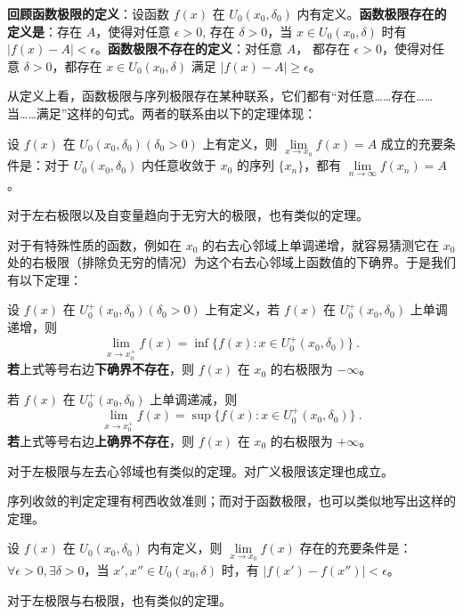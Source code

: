 \textbf{回顾函数极限的定义}：设函数 $f(x)$ 在 $U_0(x_0,\delta_0)$ 内有定义。\textbf{函数极限存在的定义是}：存在 $A$，使得对任意 $\epsilon >0$, 存在 $\delta>0$，当 $x\in U_0(x_0,\delta)$ 时有 $|f(x)-A|<\epsilon$。\textbf{函数极限不存在的定义}：对任意 $A$， 都存在 $\epsilon>0$，使得对任意 $\delta>0$，都存在 $x\in U_0(x_0,\delta)$ 满足 $|f(x)-A|\ge \epsilon$。

从定义上看，函数极限与序列极限存在某种联系，它们都有“对任意……存在……当……满足”这样的句式。两者的联系由以下的定理体现：

\begin{theorem}{}
设 $f(x)$ 在 $U_0(x_0,\delta_0)(\delta_0>0)$ 上有定义，则 $\lim\limits_{x\rightarrow x_0}f(x)=A$ 成立的充要条件是：对于 $U_0(x_0,\delta_0)$ 内任意收敛于 $x_0$ 的序列 $\{x_n\}$，都有 $\lim\limits_{n\rightarrow \infty}f(x_n)=A$。

对于左右极限以及自变量趋向于无穷大的极限，也有类似的定理。
\end{theorem}

对于有特殊性质的函数，例如在 $x_0$ 的右去心邻域上单调递增，就容易猜测它在 $x_0$ 处的右极限（排除负无穷的情况）为这个右去心邻域上函数值的下确界。于是我们有以下定理：
\begin{theorem}{}
设 $f(x)$ 在 $U_0^+(x_0,\delta_0)(\delta_0>0)$ 上有定义，若 $f(x)$ 在  $U_0^+(x_0,\delta_0)$ 上单调递增，则
\begin{equation}
  \lim\limits_{x\rightarrow x_0^+}f(x)=\inf\{f(x):x\in U_0^+(x_0,\delta_0)\}~.
\end{equation}
\textbf{若}上式等号右边\textbf{下确界不存在}，则 $f(x)$ 在 $x_0$ 的右极限为 $-\infty$。

若 $f(x)$ 在  $U_0^+(x_0,\delta_0)$ 上单调递减，则
\begin{equation}
\lim\limits_{x\rightarrow x_0^+}f(x)=\sup\{f(x):x\in U_0^+(x_0,\delta_0)\}~.
\end{equation}
\textbf{若}上式等号右边\textbf{上确界不存在}，则 $f(x)$ 在 $x_0$ 的右极限为 $+\infty$。

对于左极限与左去心邻域也有类似的定理。对广义极限该定理也成立。
\end{theorem}

序列收敛的判定定理有柯西收敛准则；而对于函数极限，也可以类似地写出这样的定理。
\begin{theorem}{}
设 $f(x)$ 在 $U_0(x_0,\delta_0)$ 内有定义，则 $\lim\limits_{x\rightarrow x_0}f(x)$ 存在的充要条件是： $\forall \epsilon>0,\exists\delta>0$，当 $x',x''\in U_0(x_0,\delta)$ 时，有 $|f(x')-f(x'')|<\epsilon$。

对于左极限与右极限，也有类似的定理。
\end{theorem}

